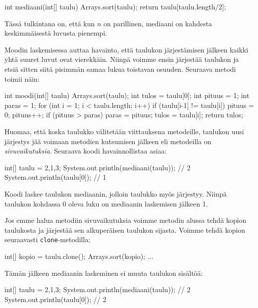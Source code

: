 \begin{code}
int mediaani(int[] taulu) {
    Arrays.sort(taulu);
    return taulu[taulu.length/2];
}
\end{code}

Tässä tulkintana on, että kun $n$ on parillinen, mediaani
on kahdesta keskimmäisestä luvusta pienempi.

Moodin laskemisessa auttaa havainto, että taulukon järjestämisen
jälkeen kaikki yhtä suuret luvut ovat vierekkäin.
Niinpä voimme ensin järjestää taulukon ja etsiä sitten siitä
pisimmän samaa lukua toistavan osuuden.
Seuraava metodi toimii näin:

\begin{code}
int moodi(int[] taulu) {
    Arrays.sort(taulu);
    int tulos = taulu[0];
    int pituus = 1;
    int paras = 1;
    for (int i = 1; i < taulu.length; i++) {
        if (taulu[i-1] != taulu[i]) pituus = 0;
        pituus++;
        if (pituus > paras) {
            paras = pituus;
            tulos = taulu[i];
        }
    }
    return tulos;
}
\end{code}

Huomaa, että koska taulukko välitetään viittauksena metodeille,
taulukon uusi järjestys jää voimaan metodien kutsumisen jälkeen
eli metodeilla on \emph{sivuvaikutuksia}.
Seuraava koodi havainnollistaa asiaa:

\begin{code}
int[] taulu = {2,1,3};
System.out.println(mediaani(taulu)); // 2
System.out.println(taulu[0]); // 1
\end{code}

Koodi laskee taulukon mediaanin, jolloin taulukko
myös järjestyy. Niinpä taulukon kohdassa 0 oleva luku
on mediaanin laskemisen jälkeen 1.

Jos emme halua metodiin sivuvaikutuksia voimme metodin
alussa tehdä kopion taulukosta ja järjestää sen alkuperäisen
taulukon sijasta. Voimme tehdä kopion seuraavasti \texttt{clone}-metodilla:

\begin{code}
int[] kopio = taulu.clone();
Arrays.sort(kopio);
...
\end{code}

Tämän jälkeen mediaanin laskeminen ei
muuta taulukon sisältöä:

\begin{code}
int[] taulu = {2,1,3};
System.out.println(mediaani(taulu)); // 2
System.out.println(taulu[0]); // 2
\end{code}
